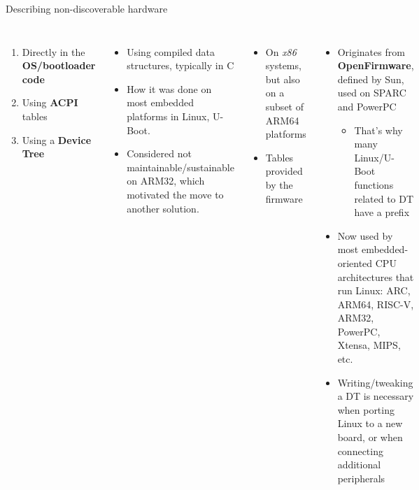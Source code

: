 \begin{frame}{Describing non-discoverable hardware}
  \begin{columns}
    \begin{enumerate}
    \item<1> Directly in the {\bf OS/bootloader code}
    \item<2> Using {\bf ACPI} tables
    \item<3> Using a {\bf Device Tree}
    \end{enumerate}
     {
      \begin{itemize}
      \item Using compiled data structures, typically in C
      \item How it was done on most embedded platforms in Linux, U-Boot.
      \item Considered not maintainable/sustainable on ARM32, which
        motivated the move to another solution.
      \end{itemize}
    }
     {
      \begin{itemize}
      \item On {\em x86} systems, but also on a subset of ARM64 platforms
      \item Tables provided by the firmware
      \end{itemize}
    }
     {
      \begin{itemize}
      \item Originates from {\bf OpenFirmware}, defined by Sun, used on
        SPARC and PowerPC
        \begin{itemize}
        \item That's why many Linux/U-Boot functions related to DT have
          a  prefix
        \end{itemize}
      \item Now used by most embedded-oriented CPU architectures that run
        Linux: ARC, ARM64, RISC-V, ARM32, PowerPC, Xtensa, MIPS, etc.
      \item Writing/tweaking a DT is necessary when porting Linux to a
        new board, or when connecting additional peripherals
      \end{itemize}
    }
  \end{columns}
\end{frame}

